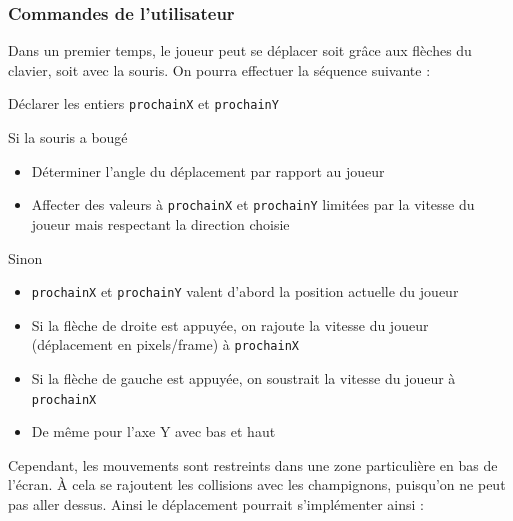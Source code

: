 \subsubsection{Commandes de l'utilisateur}
Dans un premier temps, le joueur peut se déplacer soit grâce aux flèches du clavier, soit avec la souris. On pourra effectuer la séquence suivante :
\begin{algoinfo}
	\item Déclarer les entiers \texttt{prochainX} et \texttt{prochainY}
	\item Si la souris a bougé
	\begin{itemize}
		\item Déterminer l'angle du déplacement par rapport au joueur
		\item Affecter des valeurs à \texttt{prochainX} et \texttt{prochainY} limitées par la vitesse du joueur mais respectant la direction choisie
	\end{itemize}
	\item Sinon
	\begin{itemize}
		\item \texttt{prochainX} et \texttt{prochainY} valent d'abord la position actuelle du joueur
		\item Si la flèche de droite est appuyée, on rajoute la vitesse du joueur (déplacement en pixels/frame) à \texttt{prochainX}
		\item Si la flèche de gauche est appuyée, on soustrait la vitesse du joueur à \texttt{prochainX}
		\item De même pour l'axe Y avec bas et haut
	\end{itemize}
\end{algoinfo}


Cependant, les mouvements sont restreints dans une zone particulière en bas de l'écran. À cela se rajoutent les collisions avec les champignons, puisqu'on ne peut pas aller dessus. Ainsi le déplacement pourrait s'implémenter ainsi :

